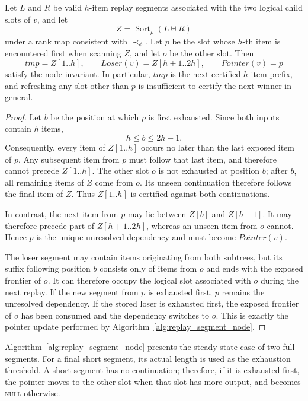 \begin{lemma}
\label{lem:segment-frontier-barrier}
Let $L$ and $R$ be valid $h$-item replay segments associated with the two
logical child slots of $v$, and let
\[
  Z=\operatorname{Sort}_{\rho}(L\uplus R)
\]
under a rank map consistent with $\prec_\phi$. Let $p$ be the slot whose
$h$-th item is encountered first when scanning $Z$, and let $o$ be the
other slot. Then
\[
  tmp=Z[1..h],
  \qquad
  \mathit{Loser}(v)=Z[h+1..2h],
  \qquad
  \mathit{Pointer}(v)=p
\]
satisfy the node invariant. In particular, $tmp$ is the next certified
$h$-item prefix, and refreshing any slot other than $p$ is insufficient
to certify the next winner in general.
\end{lemma}

\begin{proof}
Let $b$ be the position at which $p$ is first exhausted. Since both
inputs contain $h$ items,
\[
  h\le b\le 2h-1.
\]
Consequently, every item of $Z[1..h]$ occurs no later than the last
exposed item of $p$. Any subsequent item from $p$ must follow that last
item, and therefore cannot precede $Z[1..h]$. The other slot $o$ is not
exhausted at position $b$; after $b$, all remaining items of $Z$ come
from $o$. Its unseen continuation therefore follows the final item of
$Z$. Thus $Z[1..h]$ is certified against both continuations.

In contrast, the next item from $p$ may lie between $Z[b]$ and
$Z[b+1]$. It may therefore precede part of
$Z[h+1..2h]$, whereas an unseen item from $o$ cannot. Hence $p$ is the
unique unresolved dependency and must become $\mathit{Pointer}(v)$.

The loser segment may contain items originating from both subtrees, but
its suffix following position $b$ consists only of items from $o$ and
ends with the exposed frontier of $o$. It can therefore occupy the
logical slot associated with $o$ during the next replay. If the new
segment from $p$ is exhausted first, $p$ remains the unresolved
dependency. If the stored loser is exhausted first, the exposed frontier
of $o$ has been consumed and the dependency switches to $o$. This is
exactly the pointer update performed by
Algorithm~\ref{alg:replay_segment_node}.
\end{proof}

Algorithm~\ref{alg:replay_segment_node} presents the steady-state case
of two full segments. For a final short segment, its actual length is
used as the exhaustion threshold. A short segment has no continuation;
therefore, if it is exhausted first, the pointer moves to the other slot
when that slot has more output, and becomes \textsc{null} otherwise.

